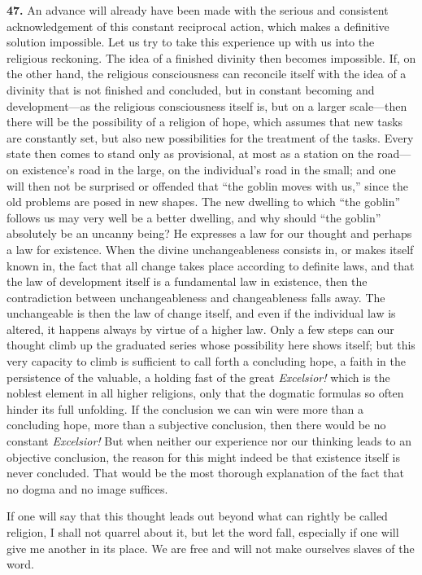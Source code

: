 \documentclass[12pt,a4paper]{book}
\newcommand{\opage}[1]{\marginnote{\footnotesize\textit{[#1]}}}
\begin{document}
\noindent\textbf{47.} An advance will already have been made with the serious and consistent
acknowledgement of this constant reciprocal action, which makes a definitive solution
impossible. Let us try to take this experience up with us into the religious reckoning. The
idea of a finished divinity then becomes impossible. If, on the other hand, the religious
consciousness can reconcile itself with the idea of a divinity that is not finished and
concluded, but in constant becoming and development---as the religious consciousness itself
is, but on a larger scale---then there will be the possibility of a religion of hope, which
assumes that new tasks are constantly set, but also new possibilities for the treatment of the
tasks. Every state then comes to stand only as provisional, at most as a station on the
road---on existence's road in the large, on the individual's road in the small; and one will
then not be surprised or offended that ``the goblin moves with us,'' since the old problems are
posed in new shapes. The new dwelling to which ``the goblin'' follows us may very well be a
better dwelling, and why should ``the goblin'' absolutely be an uncanny being? He expresses a
law for our thought and perhaps a law for existence. When the divine unchangeableness consists
in, or makes itself known in, the fact that all change takes place according to definite laws,
and that the law of development itself is a fundamental law in existence, then the contradiction
between unchangeableness and changeableness falls away. The unchangeable is then the law of
change itself, and even if the individual law is altered, it happens always by virtue of a
higher law. Only a few steps can our thought climb up the graduated series whose possibility here
shows itself; but this very capacity to climb is sufficient to call forth a concluding hope, a
faith in the persistence of the valuable, a holding fast of the great \textit{Excelsior!} which
is the noblest element in all higher religions, only that the dogmatic formulas so often 
\opage{109}hinder
its full unfolding. If the conclusion we can win were more than a concluding hope, more than a
subjective conclusion, then there would be no constant \textit{Excelsior!} But when neither our
experience nor our thinking leads to an objective conclusion, the reason for this might indeed be
that existence itself is never concluded. That would be the most thorough explanation of the fact
that no dogma and no image suffices.

If one will say that this thought leads out beyond what can rightly be called religion, I shall
not quarrel about it, but let the word fall, especially if one will give me another in its place.
We are free and will not make ourselves slaves of the word.
\end{document}
